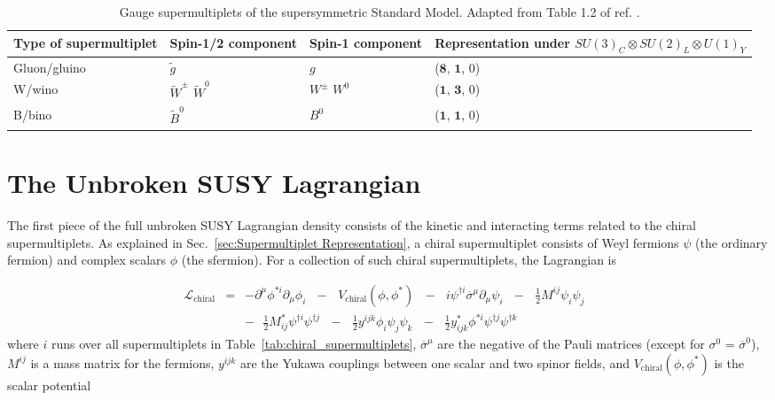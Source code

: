 \documentclass[dissertation.tex]{subfiles}
\begin{document}
\begin{table}[htbp]
\caption{Gauge supermultiplets of the supersymmetric Standard Model.  Adapted from Table 1.2 of ref. \cite{SUSY_primer}.}
\begin{tabular}{|m{5.45cm}|m{2cm}|m{2cm}|m{4cm}|}
\hline
Type of supermultiplet & Spin-1/2 component & Spin-1 component & Representation under $SU(3)_{C} \otimes SU(2)_{L} \otimes U(1)_{Y}$ \\
\hline
\hline
Gluon/gluino & $\widetilde{g}$ & $g$ & ($\mathbf{8}$, $\mathbf{1}$, 0) \\
\hline
W/wino & $\widetilde{W}^{\pm}$ $\widetilde{W}^{0}$ & $W^{\pm}$ $W^{0}$ & ($\mathbf{1}$, $\mathbf{3}$, 0) \\
\hline
B/bino & $\widetilde{B}^{0}$ & $B^{0}$ & ($\mathbf{1}$, $\mathbf{1}$, 0) \\
\hline
\end{tabular}
\label{tab:gauge_supermultiplets}
\end{table}

\section{The Unbroken SUSY Lagrangian}
\label{sec:The Unbroken SUSY Lagrangian}

The first piece of the full unbroken SUSY Lagrangian density consists of the kinetic and interacting terms related to the chiral supermultiplets.  As explained in Sec.~\ref{sec:Supermultiplet Representation}, a chiral supermultiplet consists of Weyl fermions $\psi$ (the ordinary fermion) and complex scalars $\phi$ (the sfermion).  For a collection of such chiral supermultiplets, the Lagrangian is

\begin{eqnarray}
\label{eq:L_chiral}
\mathcal{L}_{\mathrm{chiral}} &=& -\partial^{\mu}\phi^{*i}\partial_{\mu}\phi_{i}\mbox{ }-\mbox{ }V_{\mathrm{chiral}}(\phi, \phi^{*})\mbox{ }-\mbox{ }i\psi^{\dag i}\overline{\sigma}^{\mu}\partial_{\mu}\psi_{i}\mbox{ }-\mbox{ }\frac{1}{2}M^{ij}\psi_{i}\psi_{j}\mbox{ }\nonumber \\
&&-\mbox{ }\frac{1}{2}M_{ij}^{*}\psi^{\dag i}\psi^{\dag j}\mbox{ }-\mbox{ }\frac{1}{2}y^{ijk}\phi_{i}\psi_{j}\psi_{k}\mbox{ }-\mbox{ }\frac{1}{2}y_{ijk}^{*}\phi^{*i}\psi^{\dag j}\psi^{\dag k}
\end{eqnarray}
%
where $i$ runs over all supermultiplets in Table~\ref{tab:chiral_supermultiplets}, $\overline{\sigma}^{\mu}$ are the negative of the Pauli matrices (except for $\sigma^{0}$ = $\overline{\sigma}^{0}$), $M^{ij}$ is a mass matrix for the fermions, $y^{ijk}$ are the Yukawa couplings between one scalar and two spinor fields, and $V_{\mathrm{chiral}}(\phi, \phi^{*})$ is the scalar potential
\end{document}
